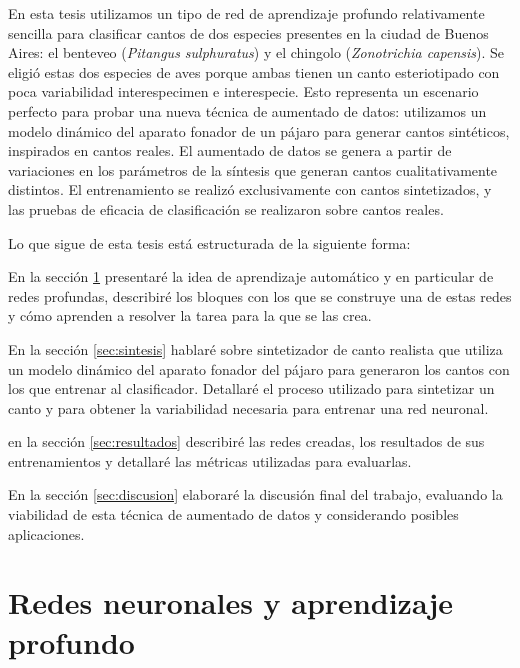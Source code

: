 \documentclass[12pt,twoside,a4paper]{article}
\begin{document}
En esta tesis utilizamos un tipo de red de aprendizaje profundo relativamente sencilla para clasificar cantos de dos especies presentes en la ciudad de Buenos Aires: el benteveo (\textit{Pitangus sulphuratus}) y el chingolo (\textit{Zonotrichia capensis}). Se eligió estas dos especies de aves porque ambas tienen un canto esteriotipado con poca variabilidad interespecimen e interespecie. Esto representa un escenario perfecto para probar una nueva técnica de aumentado de datos: utilizamos un modelo dinámico del aparato fonador de un pájaro para generar cantos sintéticos, inspirados en cantos reales. El aumentado de datos se genera a partir de variaciones en los parámetros de la síntesis que generan cantos cualitativamente distintos. El entrenamiento se realizó exclusivamente con cantos sintetizados, y las pruebas de eficacia de clasificación se realizaron sobre cantos reales.

Lo que sigue de esta tesis está estructurada de la siguiente forma:
\begin{compactitem}
  \item En la sección \ref{sec:ML} presentaré la idea de aprendizaje automático y en particular de redes profundas, describiré los bloques con los que se construye una de estas redes y cómo aprenden a resolver la tarea para la que se las crea. 
  \item En la sección \ref{sec:sintesis} hablaré sobre sintetizador de canto realista que utiliza un modelo dinámico del aparato fonador del pájaro para generaron los cantos con los que entrenar al clasificador. Detallaré el proceso utilizado para sintetizar un canto y para obtener la variabilidad necesaria para entrenar una red neuronal.
  \item en la sección \ref{sec:resultados} describiré las redes creadas, los resultados de sus entrenamientos y detallaré las métricas utilizadas para evaluarlas.
  \item En la sección \ref{sec:discusion} elaboraré la discusión final del trabajo, evaluando la viabilidad de esta técnica de aumentado de datos y considerando posibles aplicaciones.
\end{compactitem} 


\section{Redes neuronales y aprendizaje profundo}
\label{sec:ML}
\end{document}

